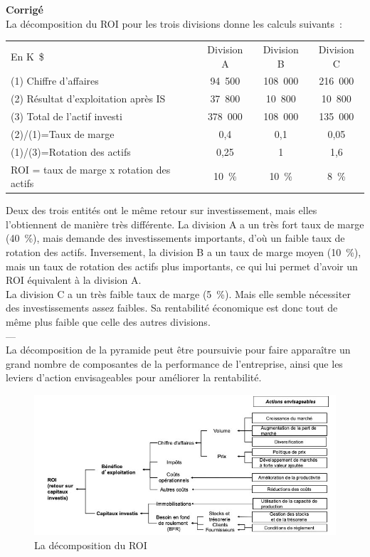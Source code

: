 \documentclass{kaobook}
\begin{document}
\textbf{Corrigé}\\
La décomposition du ROI pour les trois divisions donne les calculs suivants :\\
\begin{center}
\begin{tabular}{l c c c}
En K \$ & Division A & Division B & Division C\\
(1) Chiffre d'affaires & 94 500 & 108 000 & 216 000\\
(2) Résultat d'exploitation après IS & 37 800 & 10 800 & 10 800\\
(3) Total de l'actif investi & 378 000 & 108 000 & 135 000\\
(2)/(1)=Taux de marge & 0,4 & 0,1 & 0,05\\
(1)/(3)=Rotation des actifs & 0,25 & 1 & 1,6\\
ROI = taux de marge x rotation des actifs & 10 \% & 10 \% & 8 \%\\
\end{tabular}
\end{center}
Deux des trois entités ont le même retour sur investissement, mais elles l'obtiennent de manière très différente. La division A a un très fort taux de marge (40 \%), mais demande des investissements importants, d'où un faible taux de rotation des actifs. Inversement, la division B a un taux de marge moyen (10 \%), mais un taux de rotation des actifs plus importants, ce qui lui permet d'avoir un ROI équivalent à la division A.\\
La division C a un très faible taux de marge (5 \%). Mais elle semble nécessiter des investissements assez faibles. Sa rentabilité économique est donc tout de même plus faible que celle des autres divisions.\\
---\\
La décomposition de la pyramide peut être poursuivie pour faire apparaître un grand nombre de composantes de la performance de l'entreprise, ainsi que les leviers d'action envisageables pour améliorer la rentabilité.\\
\begin{figure}[htbp]
\centering
\includegraphics[width=.9\linewidth]{./img/roidetail.jpeg}
\caption{La décomposition du ROI}
\end{figure}
\end{document}
